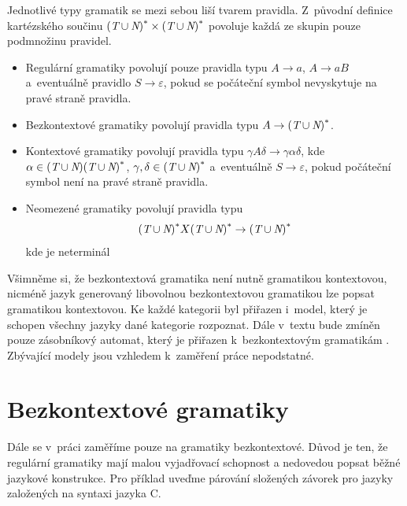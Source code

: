 		Jednotlivé typy gramatik se mezi sebou liší tvarem pravidla. Z~původní definice kartézského součinu ${(\textit{T}\cup\textit{N})}^{\ast}\times{(\textit{T}\cup\textit{N})}^{\ast}$ povoluje každá ze skupin pouze podmnožinu pravidel.
		\begin{itemize}
			\item Regulární gramatiky povolují pouze pravidla typu $A\rightarrow a$, $A\rightarrow aB$ a~eventuálně pravidlo $S\rightarrow\varepsilon$, pokud se počáteční symbol  nevyskytuje na pravé straně pravidla.
			\item Bezkontextové gramatiky povolují pravidla typu $A\rightarrow{(\textit{T}\cup\textit{N})}^{\ast}$.
			\item Kontextové gramatiky povolují pravidla typu $\gamma{A}\delta\rightarrow\gamma\alpha\delta$, kde
			$\alpha\in(\textit{T}\cup\textit{N}){(\textit{T}\cup\textit{N})}^{\ast}$, ${\gamma,\delta\in{(\textit{T}\cup\textit{N})}^{\ast}}$ 
			a~eventuálně $S\rightarrow\varepsilon$, pokud počáteční symbol  není na pravé straně pravidla.
			\item Neomezené gramatiky povolují pravidla typu 
			$${(\textit{T}\cup\textit{N})}^{\ast} X {(\textit{T}\cup\textit{N})}^{\ast} 
			\rightarrow 
			{(\textit{T}\cup\textit{N})}^{\ast}$$
			kde  je neterminál
		\end{itemize}
	
	 	Všimněme si, že bezkontextová gramatika není nutně gramatikou kontextovou, nicméně jazyk generovaný libovolnou bezkontextovou gramatikou lze popsat gramatikou kontextovou.
		Ke každé kategorii byl přiřazen i~model, který je schopen všechny jazyky dané kategorie rozpoznat.
		Dále v~textu bude zmíněn pouze zásobníkový automat, který je přiřazen k~bezkontextovým gramatikám \cite{Meduna:2014:FLC:2636678}. Zbývající modely jsou vzhledem k~zaměření práce nepodstatné.
		
		
	\section{Bezkontextové gramatiky}
		Dále se v~práci zaměříme pouze na gramatiky bezkontextové. Důvod je ten, že regulární gramatiky mají malou vyjadřovací schopnost a nedovedou popsat běžné jazykové konstrukce. Pro příklad uveďme párování složených závorek pro jazyky založených na syntaxi jazyka C.
		
